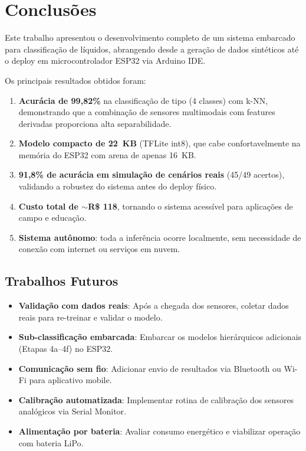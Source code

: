 \documentclass[12pt, a4paper]{article}
\begin{document}
\section{Conclus\~{o}es}

Este trabalho apresentou o desenvolvimento completo de um sistema embarcado para classifica\c{c}\~{a}o de l\'{i}quidos, abrangendo desde a gera\c{c}\~{a}o de dados sint\'{e}ticos at\'{e} o deploy em microcontrolador ESP32 via Arduino IDE.

Os principais resultados obtidos foram:

\begin{enumerate}
  \item \textbf{Acur\'{a}cia de 99,82\%} na classifica\c{c}\~{a}o de tipo (4 classes) com k-NN, demonstrando que a combina\c{c}\~{a}o de sensores multimodais com features derivadas proporciona alta separabilidade.
  \item \textbf{Modelo compacto de 22~KB} (TFLite int8), que cabe confortavelmente na mem\'{o}ria do ESP32 com arena de apenas 16~KB.
  \item \textbf{91,8\% de acur\'{a}cia em simula\c{c}\~{a}o de cen\'{a}rios reais} (45/49 acertos), validando a robustez do sistema antes do deploy f\'{i}sico.
  \item \textbf{Custo total de $\sim$R\$ 118}, tornando o sistema acess\'{i}vel para aplica\c{c}\~{o}es de campo e educa\c{c}\~{a}o.
  \item \textbf{Sistema aut\^{o}nomo}: toda a infer\^{e}ncia ocorre localmente, sem necessidade de conex\~{a}o com internet ou servi\c{c}os em nuvem.
\end{enumerate}

\subsection{Trabalhos Futuros}

\begin{itemize}
  \item \textbf{Valida\c{c}\~{a}o com dados reais}: Ap\'{o}s a chegada dos sensores, coletar dados reais para re-treinar e validar o modelo.
  \item \textbf{Sub-classifica\c{c}\~{a}o embarcada}: Embarcar os modelos hier\'{a}rquicos adicionais (Etapas 4a--4f) no ESP32.
  \item \textbf{Comunica\c{c}\~{a}o sem fio}: Adicionar envio de resultados via Bluetooth ou Wi-Fi para aplicativo mobile.
  \item \textbf{Calibra\c{c}\~{a}o automatizada}: Implementar rotina de calibra\c{c}\~{a}o dos sensores anal\'{o}gicos via Serial Monitor.
  \item \textbf{Alimenta\c{c}\~{a}o por bateria}: Avaliar consumo energ\'{e}tico e viabilizar opera\c{c}\~{a}o com bateria LiPo.
\end{itemize}
\end{document}
